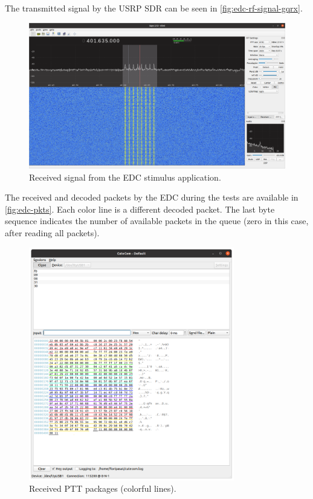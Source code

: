The transmitted signal by the USRP SDR can be seen in \autoref{fig:edc-rf-signal-gqrx}.

\begin{figure}[!ht]
    \begin{center}
        \includegraphics[width=\textwidth]{figures/edc_report/edc-stimulus}
        \caption{Received signal from the EDC stimulus application.}
        \label{fig:edc-rf-signal-gqrx}
    \end{center}
\end{figure}

The received and decoded packets by the EDC during the tests are available in \autoref{fig:edc-pkts}. Each color line is a different decoded packet. The last byte sequence indicates the number of available packets in the queue (zero in this case, after reading all packets).

\begin{figure}[!ht]
    \begin{center}
        \includegraphics[width=0.8\textwidth]{figures/edc_report/ptt-pkg}
        \caption{Received PTT packages (colorful lines).}
        \label{fig:edc-pkts}
    \end{center}
\end{figure}

